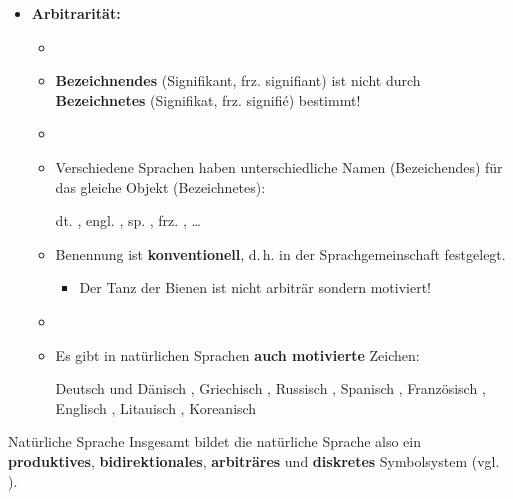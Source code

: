 \begin{frame}

\begin{itemize}
	\item<1-> \textbf{Arbitrarität:}

	\begin{itemize}
		\item[]
		\item<1-> \textbf{Bezeichnendes} (Signifikant, frz. signifiant) ist nicht durch \textbf{Bezeichnetes} (Signifikat, frz. signifié) bestimmt!
		\item[]
		\item<2-> Verschiedene Sprachen haben unterschiedliche Namen (Bezeichendes) für das gleiche Objekt (Bezeichnetes):

\pause

\ea dt. , engl. , sp. , frz. , \dots
\z

		\item<4-> Benennung ist \textbf{konventionell}, d.\,h. in der Sprachgemeinschaft festgelegt.

		\begin{itemize}
			\item<5->[$\rightarrow$] Der Tanz der Bienen ist nicht arbiträr sondern motiviert!
		\end{itemize}
			
		\item[]
		\item<6-> Es gibt in natürlichen Sprachen \textbf{auch motivierte} Zeichen:
	
\ea Deutsch und Dänisch , Griechisch , Russisch , Spanisch , Französisch , Englisch , Litauisch , Koreanisch 
\z
	
	\end{itemize}

\end{itemize}

\end{frame}



\begin{frame}
		
	\begin{block}{Natürliche Sprache}
			Insgesamt bildet die natürliche Sprache also ein \textbf{produktives}, \textbf{bidirektionales}, \textbf{arbiträres} und \textbf{diskretes} Symbolsystem (vgl. \citet{Luedeling2009a}).
	\end{block}

\end{frame}	
